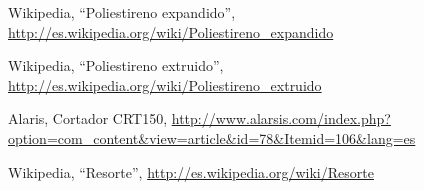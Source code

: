	Wikipedia,
	“Poliestireno expandido”,
	\scriptsize \url{http://es.wikipedia.org/wiki/Poliestireno_expandido} \normalsize

	Wikipedia,
	“Poliestireno extruido”,
	\scriptsize \url{http://es.wikipedia.org/wiki/Poliestireno_extruido} \normalsize

	Alaris,
	Cortador CRT150,
	\scriptsize \url{http://www.alarsis.com/index.php?option=com_content&view=article&id=78&Itemid=106&lang=es} \normalsize

	Wikipedia,
	“Resorte”,
	\scriptsize \url{http://es.wikipedia.org/wiki/Resorte} \normalsize